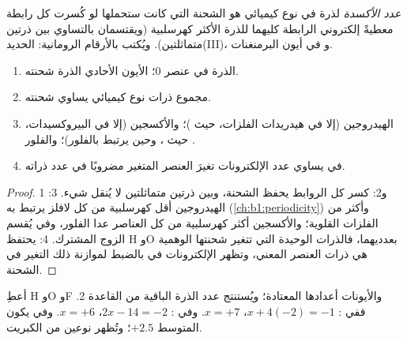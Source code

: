 \begin{definition}\label{def:b1:nernst:oxidation-number}
\emph{عدد الأكسدة} لذرة في
نوع كيميائي هو الشحنة التي كانت ستحملها لو كُسرت كل رابطة معطيةً
إلكتروني الرابطة كليهما للذرة الأكثر كهرسلبية (ويقتسمان بالتساوي
بين ذرتين متماثلتين). ويُكتب بالأرقام الرومانية: الحديد(III)،
و في أيون البرمنغنات.
\end{definition}

\begin{proposition}\label{prop:b1:nernst:on-rules}
\begin{enumerate}
  \item {} الذرة في عنصر 0؛  الأيون الأحادي الذرة
        شحنته.
  \item مجموع  ذرات نوع كيميائي يساوي
        شحنته.
  \item الهيدروجين  (إلا في هيدريدات الفلزات، حيث )؛ والأكسجين
         (إلا في البيروكسيدات، حيث ، وحين يرتبط بالفلور)؛ والفلور
        .
  \item في  يساوي عدد الإلكترونات تغيرَ
         العنصر المتغير مضروبًا في
        عدد ذراته.
\end{enumerate}
\end{proposition}

\begin{proof}
1 و2: كسر كل الروابط يحفظ الشحنة، وبين ذرتين متماثلتين
لا يُنقل شيء. 3: الهيدروجين أقل كهرسلبية من كل
لافلز يرتبط به (\cref{ch:b1:periodicity}) وأكثر من الفلزات
القلوية؛ والأكسجين أكثر كهرسلبية من كل العناصر عدا الفلور،
وفي  يُقسم الزوج المشترك. 4: يحتفظ H وO بعدديهما،
فالذرات الوحيدة التي تتغير شحنتها الوهمية هي ذرات العنصر
المعني، وتظهر الإلكترونات في  بالضبط لموازنة
ذلك التغير في الشحنة.
\end{proof}

\begin{method}\label{met:b1:nernst:oxidation-numbers}
أعطِ H وO وF والأيونات أعدادها المعتادة؛ ويُستنتج عدد الذرة
الباقية من القاعدة 2. ففي : $x + 4(-2) = -1$، $x = +7$. وفي
: $2x - 14 = -2$، $x = +6$. وفي  يكون المتوسط
$+2.5$؛ وتُظهر  نوعين من الكبريت.
\end{method}

